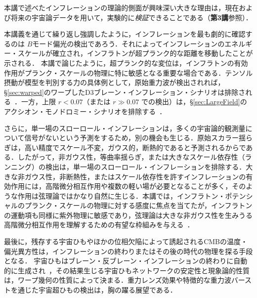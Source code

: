 \label{sec:obs}

本講で述べたインフレーションの理論的側面が興味深い大きな理由は，現在および将来の宇宙論データを用いて，実験的に{\it 検証}できることである（{\bf 第3講}参照）．



本講義を通じて繰り返し強調したように，インフレーションを最も劇的に確認するのは $B$モード偏光の検出であろう．それによってインフレーションのエネルギー・スケールが確立され，インフラトンが超プランク的な距離を移動したことが示される．
本講で論じたように，超プランク的な変位は，インフラトンの有効作用がプランク・スケールの物理に特に敏感となる重要な場合である．テンソル摂動が模型を判別する力の具体例として，原始重力波が検出されれば，\S\ref{sec:warped}のワープしたD3ブレーン・インフレーション・シナリオは排除される~\cite{Baumann:2006cd}．一方，上限 $r<0.07$（または $r\gg 0.07$ での検出）は，\S\ref{sec:LargeField}のアクシオン・モノドロミー・シナリオを排除する~\cite{MSW}．

さらに，単一場のスローロール・インフレーションは，多くの宇宙論的観測量について信号がないという予測をするため，別の機会も生じる．原始スカラー揺らぎは，高い精度でスケール不変，ガウス的，断熱的であると予測されるからである．したがって，非ガウス性，等曲率揺らぎ，または大きなスケール依存性（ランニング）の検出は，単一場のスローロール・インフレーションを排除する．大きな非ガウス性，非断熱性，またはスケール依存性を許すインフレーションの有効作用には，高階微分相互作用や複数の軽い場が必要となることが多く，そのような作用は弦理論ではかなり自然に生じる．本講では，インフラトン・ポテンシャルのプランク・スケールの物理に対する感度に焦点を当てたが，インフラトンの運動項も同様に紫外物理に敏感であり，弦理論は大きな非ガウス性を生みうる高階微分相互作用を理解するための有望な枠組みを与える~\cite{DBI,Alishahiha:2004eh}．

最後に，残存する宇宙ひもやほかの位相欠陥によって誘起されるCMBの温度・偏光異方性は，インフレーションの終わりまたはその後の時代の物理を探る手段となる．
宇宙ひもはブレーン・反ブレーン・インフレーションの終わりに自動的に生成され~\cite{Sarangi, CMP}，その結果生じる宇宙ひもネットワークの安定性と現象論的性質は，ワープ幾何の性質によって決まる．重力レンズ効果や特徴的な重力波バーストを通じた宇宙超ひもの検出は，胸の躍る展望である．\\



